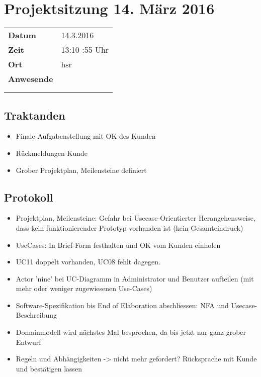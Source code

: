 \documentclass[class=scrbook,crop=false]{standalone}
\begin{document}
	
	\section*{Projektsitzung 14. März 2016}
	
	\begin{tabular}{ll}
		\textbf{Datum} & 14.3.2016 \\
		\textbf{Zeit} & 13:10 \textendash 13:55 Uhr \\
		\textbf{Ort} & \acs{hsr} \\
		\textbf{Anwesende} & \proff \\ & \ubos \\ & \pchr
	\end{tabular}
	
	\subsection*{Traktanden}
	
	\begin{itemize}
		\item Finale Aufgabenstellung mit OK des Kunden
        \item Rückmeldungen Kunde
        \item Grober Projektplan, Meilensteine definiert
	\end{itemize}
	
	\subsection*{Protokoll}
	
	\begin{itemize}
		\item Projektplan, Meilensteine: Gefahr bei Usecase-Orientierter Herangehensweise, dass kein funktionierender Prototyp vorhanden ist (kein Gesamteindruck)
		\item UseCases: In Brief-Form festhalten und OK vom Kunden einholen
		\item UC11 doppelt vorhanden, UC08 fehlt dagegen.
		\item Actor '\gls{nine}' bei UC-Diagramm in Administrator und Benutzer aufteilen (mit mehr oder weniger zugewiesenen Use-Cases)
		\item Software-Spezifikation bis End of Elaboration abschliessen: NFA und Usecase-Beschreibung
		\item Domainmodell wird nächstes Mal besprochen, da bis jetzt nur ganz grober Entwurf
		\item Regeln und Abhängigkeiten -> nicht mehr gefordert? Rücksprache mit Kunde und bestätigen lassen
	\end{itemize}
	
\end{document}
